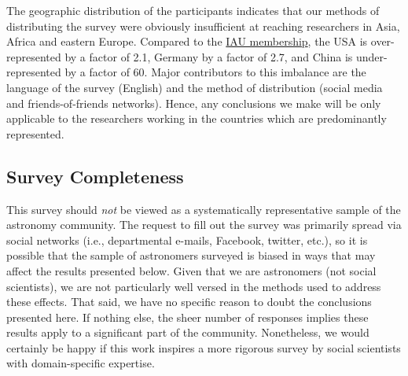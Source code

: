 The geographic distribution of the participants indicates that our methods of distributing the survey were obviously insufficient at reaching researchers in Asia, Africa and eastern Europe. Compared to the \href{http://www.iau.org/administration/membership/individual/distribution/}{IAU membership}, the USA is over-represented by a factor of 2.1, Germany by a factor of 2.7, and China is under-represented by a factor of 60. Major contributors to this imbalance are the language of the survey (English) and the method of distribution (social media and friends-of-friends networks). Hence, any conclusions we make will be only applicable to the researchers working in the countries which are predominantly represented.

\subsection{Survey Completeness}

This survey should \emph{not} be viewed as a systematically representative sample of the astronomy community.  
The request to fill out the survey was primarily spread via social networks (i.e., departmental e-mails, Facebook, twitter, etc.), so it is possible that the sample of astronomers surveyed is biased in ways that may affect the results presented below.
Given that we are astronomers (not social scientists), we are not particularly well versed in the methods used to address these effects.
That said, we have no specific reason to doubt the conclusions presented here.  If nothing else, the sheer number of responses implies these results apply to a significant part of the community.
Nonetheless, we would certainly be happy if this work inspires a more rigorous survey by social scientists with domain-specific expertise.
